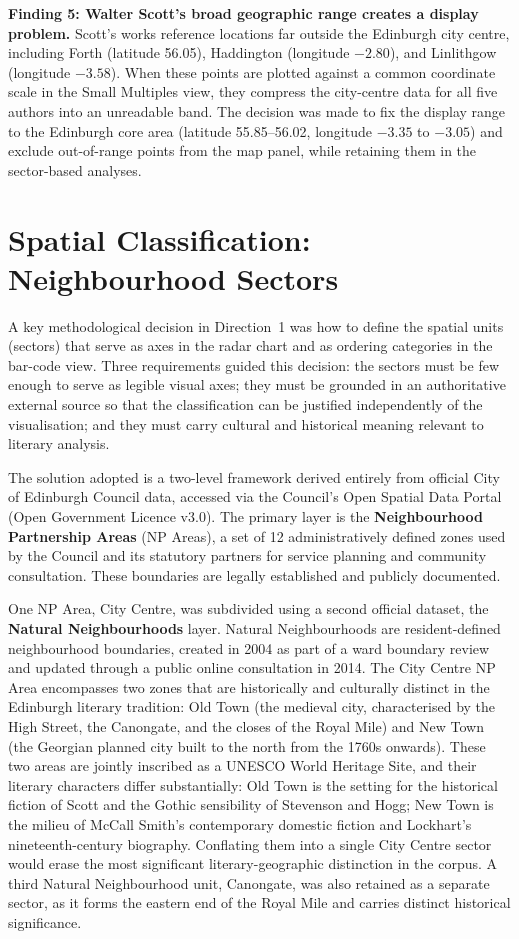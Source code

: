 \documentclass[logo,msc]{infthesis}
\begin{document}
\textbf{Finding 5: Walter Scott's broad geographic range creates a display problem.} Scott's works reference locations far outside the Edinburgh city centre, including Forth (latitude 56.05), Haddington (longitude $-2.80$), and Linlithgow (longitude $-3.58$). When these points are plotted against a common coordinate scale in the Small Multiples view, they compress the city-centre data for all five authors into an unreadable band. The decision was made to fix the display range to the Edinburgh core area (latitude 55.85--56.02, longitude $-3.35$ to $-3.05$) and exclude out-of-range points from the map panel, while retaining them in the sector-based analyses.
 
\section{Spatial Classification: Neighbourhood Sectors}
\label{sec:sectors}
 
A key methodological decision in Direction~1 was how to define the spatial units (sectors) that serve as axes in the radar chart and as ordering categories in the bar-code view. Three requirements guided this decision: the sectors must be few enough to serve as legible visual axes; they must be grounded in an authoritative external source so that the classification can be justified independently of the visualisation; and they must carry cultural and historical meaning relevant to literary analysis.
 
The solution adopted is a two-level framework derived entirely from official City of Edinburgh Council data, accessed via the Council's Open Spatial Data Portal (Open Government Licence v3.0). The primary layer is the \textbf{Neighbourhood Partnership Areas} (NP Areas), a set of 12 administratively defined zones used by the Council and its statutory partners for service planning and community consultation. These boundaries are legally established and publicly documented.
 
One NP Area, City Centre, was subdivided using a second official dataset, the \textbf{Natural Neighbourhoods} layer. Natural Neighbourhoods are resident-defined neighbourhood boundaries, created in 2004 as part of a ward boundary review and updated through a public online consultation in 2014. The City Centre NP Area encompasses two zones that are historically and culturally distinct in the Edinburgh literary tradition: Old Town (the medieval city, characterised by the High Street, the Canongate, and the closes of the Royal Mile) and New Town (the Georgian planned city built to the north from the 1760s onwards). These two areas are jointly inscribed as a UNESCO World Heritage Site, and their literary characters differ substantially: Old Town is the setting for the historical fiction of Scott and the Gothic sensibility of Stevenson and Hogg; New Town is the milieu of McCall Smith's contemporary domestic fiction and Lockhart's nineteenth-century biography. Conflating them into a single City Centre sector would erase the most significant literary-geographic distinction in the corpus. A third Natural Neighbourhood unit, Canongate, was also retained as a separate sector, as it forms the eastern end of the Royal Mile and carries distinct historical significance.
 
\end{document}
